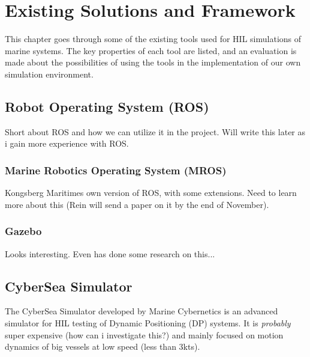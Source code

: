 \chapter{Existing Solutions and Framework}
This chapter goes through some of the existing tools used for HIL simulations of marine systems. The key properties of each tool are listed, and an evaluation is made about the possibilities of using the tools in the implementation of our own simulation environment.

\section{Robot Operating System (ROS)}
Short about ROS and how we can utilize it in the project. Will write this later as i gain more experience with ROS. 

\subsection{Marine Robotics Operating System (MROS)}
Kongsberg Maritimes own version of ROS, with some extensions. Need to learn more about this (Rein will send a paper on it by the end of November).

\subsection{Gazebo}
Looks interesting. Even has done some research on this...

\section{CyberSea Simulator}
The CyberSea Simulator developed by Marine Cybernetics is an advanced simulator for HIL testing of Dynamic Positioning (DP) systems. It is \emph{probably} super expensive (how can i investigate this?) and mainly focused on motion dynamics of big vessels at low speed (less than 3kts).

